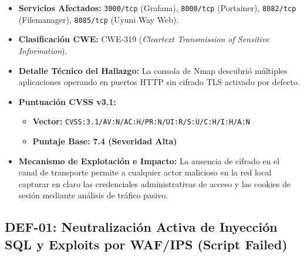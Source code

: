 \begin{itemize}
  \item \textbf{Servicios Afectados:} \texttt{3000/tcp} (Grafana), \texttt{8000/tcp} (Portainer), \texttt{8082/tcp} (Filemanager), \texttt{8085/tcp} (Uyuni Way Web).
  \item \textbf{Clasificación CWE:} CWE-319 (\textit{Cleartext Transmission of Sensitive Information}).
  \item \textbf{Detalle Técnico del Hallazgo:} La consola de Nmap descubrió múltiples aplicaciones operando en puertos HTTP sin cifrado TLS activado por defecto.
  \item \textbf{Puntuación CVSS v3.1:}
    \begin{itemize}
      \item \textbf{Vector:} \texttt{CVSS:3.1/AV:N/AC:H/PR:N/UI:R/S:U/C:H/I:H/A:N}
      \item \textbf{Puntaje Base:} \textbf{7.4 (Severidad Alta)}
    \end{itemize}
  \item \textbf{Mecanismo de Explotación e Impacto:} La ausencia de cifrado en el canal de transporte permite a cualquier actor malicioso en la red local capturar en claro las credenciales administrativas de acceso y las cookies de sesión mediante análisis de tráfico pasivo.
\end{itemize}

\subsection{DEF-01: Neutralización Activa de Inyección SQL y Exploits por WAF/IPS (Script Failed)}

